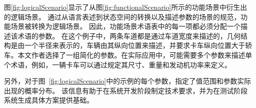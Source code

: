 图\ref{fig:logicalScenario}显示了从图\ref{fig:functionalScenario}所示的功能场景中衍生出的逻辑场景。
通过从语言表述到状态空间的转换以及描述参数的场景的规范，功能场景被转换为逻辑场景。
因此，功能场景术语表中的每一项都必须分配一个描述该术语的参数。
在这个例子中，两条车道都是通过车道宽度来描述的，几何结构是由一个半径来表示的，车辆由其纵向位置来描述，并要求卡车纵向位置大于轿车。本文作者选择了一组简化的参数。在实际应用中，可能需要多个参数来描述单个术语，例如，一辆卡车可以通过规定其尺寸、重量和发动机功率来定义。
%

另外，对于图~\ref {fig:logicalScenario}中的示例的每个参数，指定了值范围和参数实际出现的概率分布。
该信息有助于在系统开发阶段制定技术要求，并为在测试阶段系统生成具体方案提供基础。

%

